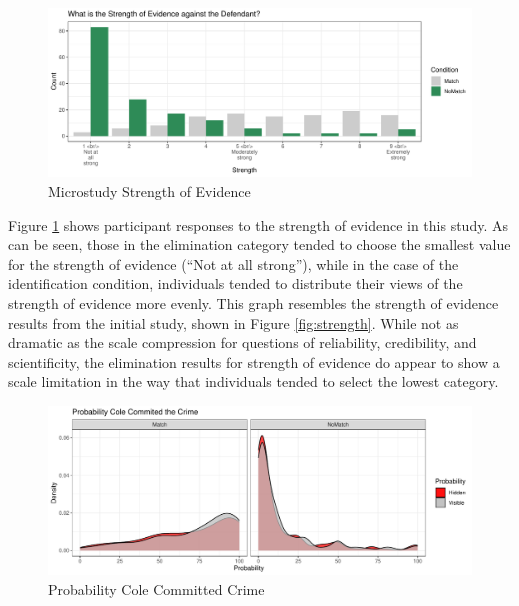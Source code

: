 \documentclass[print]{nuthesis}
\begin{document}
\begin{figure}

{\centering \includegraphics[width=\linewidth]{thesis_files/figure-latex/strength2-1} 

}

\caption{Microstudy Strength of Evidence}\label{fig:strength2}
\end{figure}

Figure \ref{fig:strength2} shows participant responses to the strength of evidence in this study.
As can be seen, those in the elimination category tended to choose the smallest value for the strength of evidence (``Not at all strong''), while in the case of the identification condition, individuals tended to distribute their views of the strength of evidence more evenly.
This graph resembles the strength of evidence results from the initial study, shown in Figure \ref{fig:strength}.
While not as dramatic as the scale compression for questions of reliability, credibility, and scientificity, the elimination results for strength of evidence do appear to show a scale limitation in the way that individuals tended to select the lowest category.

\begin{figure}

{\centering \includegraphics[width=\linewidth]{thesis_files/figure-latex/prob2-1} 

}

\caption{Probability Cole Committed Crime}\label{fig:prob2}
\end{figure}
\end{document}
